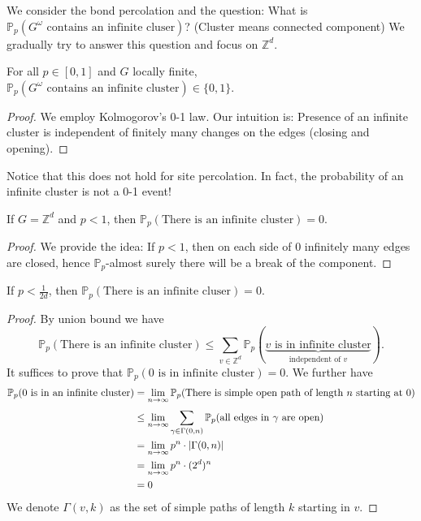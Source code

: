 We consider the bond percolation and the question: What is \(\mathbb{P}_p(G^{\omega } \text{ contains an infinite cluser})\)? (Cluster means connected component) We gradually try to answer this question and focus on \(\mathbb{Z}^d\). 

\begin{fact}[]
  For all \(p \in [0,1]\) and \(G\) locally finite, \(\mathbb{P}_p(G^{\omega }\text{ contains an infinite cluster})\in \{0,1\}\).
\end{fact}

\begin{proof}
    We employ Kolmogorov's 0-1 law. Our intuition is: Presence of an infinite cluster is independent of finitely many changes on the edges (closing and opening). 
\end{proof}

Notice that this does not hold for site percolation. In fact, the probability of an infinite cluster is not a 0-1 event!

\begin{fact}[]
    If \(G=\mathbb{Z}^d\) and \(p < 1\), then \(\mathbb{P}_p(\text{There is an infinite cluster})=0\).
\end{fact}

\begin{proof}
    We provide the idea: If \(p < 1\), then on each side of 0 infinitely many edges are closed, hence \(\mathbb{P}_p\)-almost surely there will be a break of the component.
\end{proof}


\begin{fact}[]
    If \(p < \frac{1}{2d}\), then \(\mathbb{P}_p(\text{There is an infinite cluser})=0\).
\end{fact}

\begin{proof}
    By union bound we have
    \[\mathbb{P}_p(\text{There is an infinite cluster}) \leq \sum_{v \in \mathbb{Z}^d}^{} \mathbb{P}_p(\underbrace{\text{\(v\) is in infinite cluster}}_{\text{independent of \(v\)}}).\]
    It suffices to prove that \(\mathbb{P}_p(\text{0 is in infinite cluster})=0\). We further have
    \begin{align*}
      \mathbb{P}_p(\text{0 is in an infinite cluster}) &= \lim_{n \to \infty} \mathbb{P}_p(\text{There is simple open path of length \(n\) starting at 0})\\
                                                       &\leq \lim_{n \to \infty} \sum_{\gamma \in \Gamma(0,n) }^{} \mathbb{P}_p(\text{all edges in \(\gamma \) are open}) \\
                                                       &=\lim_{n \to \infty} p^n \cdot \abs{\Gamma(0,n) } \\
                                                       &= \lim_{n \to \infty} p^n \cdot (2^d)^n \\
                                                       &=0
    \end{align*}
   We denote \(\Gamma(v,k) \) as the set of simple paths of length \(k\) starting in \(v\).
\end{proof}


